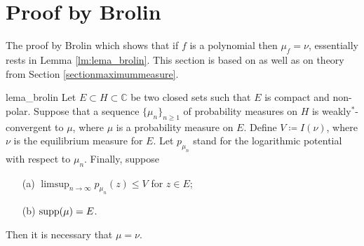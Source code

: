 \section{Proof by Brolin}

The proof by Brolin which shows that if $f$ is a polynomial then $\mu_f=\nu$, essentially rests in Lemma \ref{lm:lema_brolin}. This section is based on \cite{brolin1965invariant} as well as on theory from Section \ref{sectionmaximummeasure}.\\

\begin{mylema}{}{lema_brolin}
Let $E\subset H\subset \mathbb{C}$ be two closed sets such that $E$ is compact and non-polar. Suppose that a sequence $\{\mu_n\}_{n\geq 1}$ of probability measures on $H$ is weakly$^*$-convergent to $\mu$, where $\mu$ is a probability measure on $E$. Define $V\coloneqq I(\nu)$, where $\nu$ is the equilibrium measure for $E$. Let $p_{\mu_n}$ stand for the logarithmic potential with respect to $\mu_n$. Finally, suppose
\begin{itemize}
\item[(a)] $\limsup_{n\rightarrow \infty} p_{\mu_n}(z) \leq V$ for $z\in E$;\\
\item[(b)] $\text{supp}(\mu)=E$.
\end{itemize}
Then it is necessary that $\mu=\nu$.
\end{mylema}

